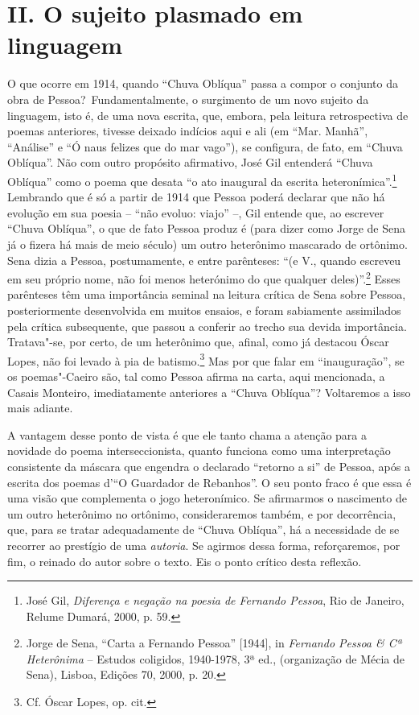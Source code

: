 \section*{II. O sujeito plasmado em linguagem}

O que ocorre em 1914, quando ``Chuva Oblíqua'' passa a compor o conjunto
da obra de Pessoa?~Fundamentalmente, o surgimento de um novo sujeito da
linguagem, isto é, de uma nova escrita, que, embora, pela leitura
retrospectiva de poemas anteriores, tivesse deixado indícios aqui e ali
(em ``Mar. Manhã'', ``Análise'' e ``Ó naus felizes que do mar vago''),
se configura, de fato, em ``Chuva Oblíqua''. Não com outro propósito
afirmativo, José Gil entenderá ``Chuva Oblíqua'' como o poema que desata
``o ato inaugural da escrita heteronímica''.\footnote{José Gil,
  \emph{Diferença e negação na poesia de Fernando Pessoa}, Rio de
  Janeiro, Relume Dumará, 2000, p. 59.} Lembrando que é só a partir de
1914 que Pessoa poderá declarar que não há evolução em sua poesia --
``não evoluo: viajo'' --, Gil entende que, ao escrever ``Chuva
Oblíqua'', o que de fato Pessoa produz é (para dizer como Jorge de Sena
já o fizera há mais de meio século) um outro heterônimo mascarado de
ortônimo. Sena dizia a Pessoa, postumamente, e entre parênteses: ``(e
V., quando escreveu em seu próprio nome, não foi menos heterónimo do que
qualquer deles)''.\footnote{Jorge de Sena, ``Carta a Fernando Pessoa''
  {[}1944{]}, in \emph{Fernando Pessoa \& Cª Heterônima} -- Estudos
  coligidos, 1940-1978, 3ª ed., (organização de Mécia de Sena), Lisboa,
  Edições 70, 2000, p. 20.} Esses parênteses têm uma importância seminal
na leitura crítica de Sena sobre Pessoa, posteriormente desenvolvida em
muitos ensaios, e foram sabiamente assimilados pela crítica subsequente,
que passou a conferir ao trecho sua devida importância. Tratava"-se, por
certo, de um heterônimo que, afinal, como já destacou Óscar Lopes, não
foi levado à pia de batismo.\footnote{Cf. Óscar Lopes, op. cit.} Mas por
que falar em ``inauguração'', se os poemas"-Caeiro são, tal como Pessoa
afirma na carta, aqui mencionada, a Casais Monteiro, imediatamente
anteriores a ``Chuva Oblíqua''? Voltaremos a isso mais adiante.

A vantagem desse ponto de vista é que ele tanto chama a atenção para a
novidade do poema interseccionista, quanto funciona como uma
interpretação consistente da máscara que engendra o declarado ``retorno
a si'' de Pessoa, após a escrita dos poemas d'``O Guardador de
Rebanhos''. O seu ponto fraco é que essa é uma visão que complementa o
jogo heteronímico. Se afirmarmos o nascimento de um outro heterônimo no
ortônimo, consideraremos também, e por decorrência, que, para se tratar
adequadamente de ``Chuva Oblíqua'', há a necessidade de se recorrer ao
prestígio de uma \emph{autoria}. Se agirmos dessa forma, reforçaremos,
por fim, o reinado do autor sobre o texto. Eis o ponto crítico desta
reflexão.


